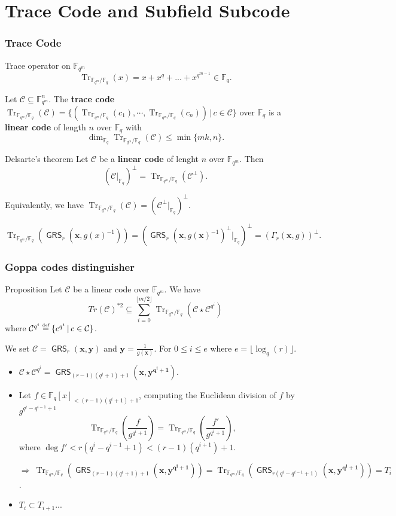 \documentclass[
10pt, %
%
aspectratio=169, %
]{beamer}
\theoremstyle{plain}%
\theoremstyle{definition}
\theoremstyle{remark}
\newcommand{\calC}{\mathcal{C}}
\newcommand{\fqm}{\mathbb{F}_{q^m}}
\newcommand{\fq}{\mathbb{F}_{q}}
\newcommand{\Tr}[1]{\operatorname{Tr}_{\mathbb{F}_{q^m}/\fq}\left(#1\right)}
\newcommand{\GRS}{\operatorname{\mathsf{GRS}}}
\newcommand\myeq{\mathrel{\stackrel{\makebox[0pt]{\mbox{\normalfont\tiny def}}}{=}}}
\begin{document}
\section{Trace Code and Subfield Subcode}
\begin{frame}
	\frametitle{Trace Code}
	\begin{block}{Trace operator on $\mathbb{F}_{q^m}$}
		\[\Tr{x} = x + x^q + ... + x^{q^{m-1}} \in \fq.\]
	\end{block}

Let $\calC \subseteq \fqm^n$. The \textbf{trace code} $\Tr{\calC}=\{(\Tr{c_1},\cdots,\Tr{c_n})\,|\, c\in \calC\}$ over $\fq$ is a \textbf{linear code} of length $n$ over $\fq$ with
\[\dim_{\mathbb{F}_q} \Tr{\calC} \leq \min\{mk,n\}.\]	
\vspace{-1.2em}
\begin{block}{Delsarte's theorem}
	Let $\calC$ be a \textbf{linear code} of lenght $n$ over $\fqm$. Then
	\[\left(\calC|_{\fq}\right)^{\perp} = \Tr{\calC^{\perp}}.\]
\end{block}
Equivalently, we have $\Tr{\calC}= \left(\calC^{\perp}|_{\fq}\right)^{\perp}$.
\vspace{-0.5em}
\begin{tcolorbox}[colback=gold]
	\[\Tr{\GRS_r(\mathbf{x},g(x)^{-1})} =( \GRS_r(\mathbf{x},g(\mathbf{x})^{-1})^\perp|_{\fq})^\perp= (\Gamma_r(\mathbf{x},g))^{\perp}.\]
\end{tcolorbox}
\end{frame}
\begin{frame}
	\frametitle{Goppa codes distinguisher \cite{MT21}}
	\begin{block}{Proposition \cite{MT21}}
		Let $\calC$ be a linear code over $\fqm$. We have
		\vspace{-0.9em}
		$$Tr(\calC)^{*2}\subseteq \sum\limits_{i=0}^{\lfloor{m/2} \rfloor} \Tr{\calC\star \calC^{q^i}}$$
		where $\calC^{q^i} \myeq \{c^{q^i} \,| \, c \in \calC \}  $.
	\end{block}
	We set $\calC = \GRS_r(\mathbf{x},\mathbf{y})$ and $\mathbf{y}=\frac{1}{g(\mathbf{x})}$. For $0\leq i\leq e$ where $e=\lfloor \log_q(r)\rfloor$.
	\begin{itemize}
		\item $\calC\star \calC^{q^i}=\GRS_{(r-1)(q^i+1)+1}(\mathbf{x},\mathbf{y^{q^i+1}})$.
		\item Let $f \in \fq[x]_{<(r-1)(q^i+1)+1}$, computing the Euclidean division of $f$ by $g^{q^i -q^{i-1}+1}$
		\[ \Tr{\frac{f}{g^{q^i +1}}}=\Tr{\frac{f'}{g^{q^i +1}}},\]
		where $\deg f' < r(q^i -q^{i-1}+1)<(r-1)(q^{i
			+1})+1$.
		
		$\Rightarrow \: \Tr{\GRS_{(r-1)(q^i+1)+1}(\mathbf{x},\mathbf{y^{q^i+1}})} = \Tr{\GRS_{r(q^i -q^{i-1}+1)}(\mathbf{x},\mathbf{y^{q^i+1}})} = T_i$.
		\item $T_i \subset T_{i+1}$...
	\end{itemize}
\end{frame}
\end{document}
